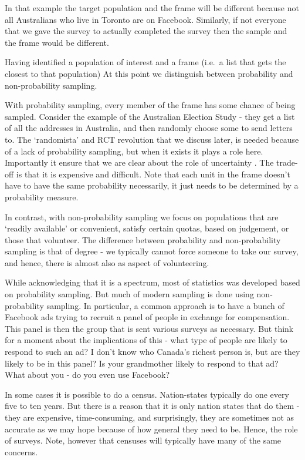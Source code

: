 \documentclass[
]{book}
\begin{document}
In that example the target population and the frame will be different because not all Australians who live in Toronto are on Facebook. Similarly, if not everyone that we gave the survey to actually completed the survey then the sample and the frame would be different.

Having identified a population of interest and a frame (i.e.~a list that gets the closest to that population) At this point we distinguish between probability and non-probability sampling.

With probability sampling, every member of the frame has some chance of being sampled. Consider the example of the Australian Election Study - they get a list of all the addresses in Australia, and then randomly choose some to send letters to. The `randomista' and RCT revolution that we discuss later, is needed because of a lack of probability sampling, but when it exists it plays a role here. Importantly it ensure that we are clear about the role of uncertainty \citep[p.~11]{wuandthompson}. The trade-off is that it is expensive and difficult. Note that each unit in the frame doesn't have to have the same probability necessarily, it just needs to be determined by a probability measure.

In contrast, with non-probability sampling we focus on populations that are `readily available' or convenient, satisfy certain quotas, based on judgement, or those that volunteer. The difference between probability and non-probability sampling is that of degree - we typically cannot force someone to take our survey, and hence, there is almost also as aspect of volunteering.

While acknowledging that it is a spectrum, most of statistics was developed based on probability sampling. But much of modern sampling is done using non-probability sampling. In particular, a common approach is to have a bunch of Facebook ads trying to recruit a panel of people in exchange for compensation. This panel is then the group that is sent various surveys as necessary. But think for a moment about the implications of this - what type of people are likely to respond to such an ad? I don't know who Canada's richest person is, but are they likely to be in this panel? Is your grandmother likely to respond to that ad? What about you - do you even use Facebook?

In some cases it is possible to do a census. Nation-states typically do one every five to ten years. But there is a reason that it is only nation states that do them - they are expensive, time-consuming, and surprisingly, they are sometimes not as accurate as we may hope because of how general they need to be. Hence, the role of surveys. Note, however that censuses will typically have many of the same concerns.
\end{document}
